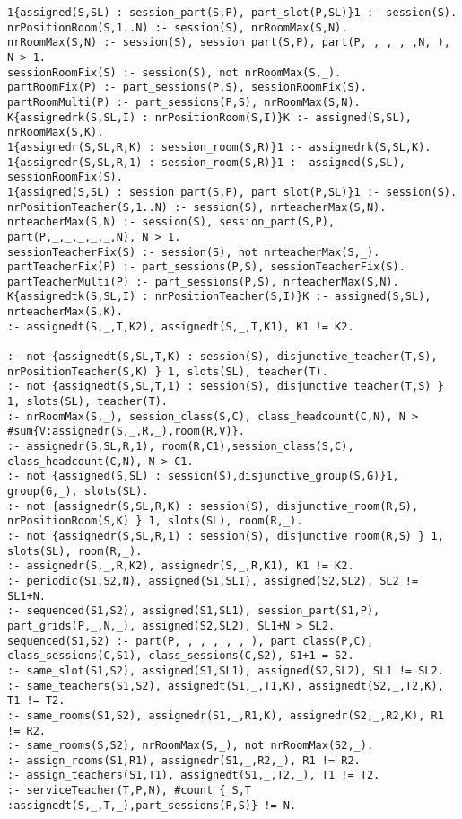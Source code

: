 \documentclass[runningheads]{llncs}
\begin{document}
\newpage
\begin{lstlisting}[style=PrologStyle, caption={ASP model}, label={lst:model-asp}]
1{assigned(S,SL) : session_part(S,P), part_slot(P,SL)}1 :- session(S).
nrPositionRoom(S,1..N) :- session(S), nrRoomMax(S,N).
nrRoomMax(S,N) :- session(S), session_part(S,P), part(P,_,_,_,_,N,_), N > 1.
sessionRoomFix(S) :- session(S), not nrRoomMax(S,_).
partRoomFix(P) :- part_sessions(P,S), sessionRoomFix(S).
partRoomMulti(P) :- part_sessions(P,S), nrRoomMax(S,N).
K{assignedrk(S,SL,I) : nrPositionRoom(S,I)}K :- assigned(S,SL), nrRoomMax(S,K).
1{assignedr(S,SL,R,K) : session_room(S,R)}1 :- assignedrk(S,SL,K).
1{assignedr(S,SL,R,1) : session_room(S,R)}1 :- assigned(S,SL), sessionRoomFix(S).
1{assigned(S,SL) : session_part(S,P), part_slot(P,SL)}1 :- session(S).
nrPositionTeacher(S,1..N) :- session(S), nrteacherMax(S,N).
nrteacherMax(S,N) :- session(S), session_part(S,P), part(P,_,_,_,_,_,N), N > 1.
sessionTeacherFix(S) :- session(S), not nrteacherMax(S,_).
partTeacherFix(P) :- part_sessions(P,S), sessionTeacherFix(S).
partTeacherMulti(P) :- part_sessions(P,S), nrteacherMax(S,N).
K{assignedtk(S,SL,I) : nrPositionTeacher(S,I)}K :- assigned(S,SL), nrteacherMax(S,K).
:- assignedt(S,_,T,K2), assignedt(S,_,T,K1), K1 != K2.

:- not {assignedt(S,SL,T,K) : session(S), disjunctive_teacher(T,S), nrPositionTeacher(S,K) } 1, slots(SL), teacher(T).
:- not {assignedt(S,SL,T,1) : session(S), disjunctive_teacher(T,S) } 1, slots(SL), teacher(T).
:- nrRoomMax(S,_), session_class(S,C), class_headcount(C,N), N > #sum{V:assignedr(S,_,R,_),room(R,V)}.
:- assignedr(S,SL,R,1), room(R,C1),session_class(S,C), class_headcount(C,N), N > C1.
:- not {assigned(S,SL) : session(S),disjunctive_group(S,G)}1, group(G,_), slots(SL).
:- not {assignedr(S,SL,R,K) : session(S), disjunctive_room(R,S), nrPositionRoom(S,K) } 1, slots(SL), room(R,_).
:- not {assignedr(S,SL,R,1) : session(S), disjunctive_room(R,S) } 1, slots(SL), room(R,_).
:- assignedr(S,_,R,K2), assignedr(S,_,R,K1), K1 != K2.
:- periodic(S1,S2,N), assigned(S1,SL1), assigned(S2,SL2), SL2 != SL1+N.
:- sequenced(S1,S2), assigned(S1,SL1), session_part(S1,P), part_grids(P,_,N,_), assigned(S2,SL2), SL1+N > SL2.
sequenced(S1,S2) :- part(P,_,_,_,_,_,_), part_class(P,C), class_sessions(C,S1), class_sessions(C,S2), S1+1 = S2.
:- same_slot(S1,S2), assigned(S1,SL1), assigned(S2,SL2), SL1 != SL2.
:- same_teachers(S1,S2), assignedt(S1,_,T1,K), assignedt(S2,_,T2,K), T1 != T2.
:- same_rooms(S1,S2), assignedr(S1,_,R1,K), assignedr(S2,_,R2,K), R1 != R2.
:- same_rooms(S,S2), nrRoomMax(S,_), not nrRoomMax(S2,_).
:- assign_rooms(S1,R1), assignedr(S1,_,R2,_), R1 != R2.
:- assign_teachers(S1,T1), assignedt(S1,_,T2,_), T1 != T2.
:- serviceTeacher(T,P,N), #count { S,T :assignedt(S,_,T,_),part_sessions(P,S)} != N.
\end{lstlisting}
%
\end{document}
